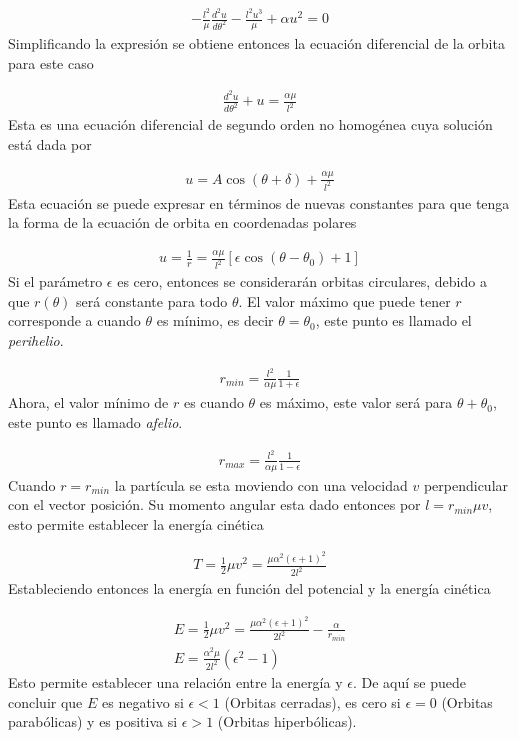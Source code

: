 \begin{gather*}
    -\frac{l^2}{\mu}\frac{d^2u}{d\theta^2} - \frac{l^2u^3}{\mu} + \alpha u^2 = 0
\end{gather*}
Simplificando la expresión se obtiene entonces la ecuación diferencial de la orbita para este caso 

\begin{gather}
    \frac{d^2u}{d\theta^2} + u = \frac{\alpha\mu}{l^2}
\end{gather}
Esta es una ecuación diferencial de segundo orden no homogénea cuya solución está dada por 

\begin{gather*}
    u = A\cos(\theta + \delta) + \frac{\alpha \mu}{l^2}
\end{gather*}
Esta ecuación se puede expresar en términos de nuevas constantes para que tenga la forma de la ecuación de orbita en coordenadas polares

\begin{gather}
    u  = \frac{1}{r} = \frac{\alpha \mu}{l^2}\left[\epsilon\cos(\theta - \theta_0) + 1\right]
\end{gather}
Si el parámetro $\epsilon$ es cero, entonces se considerarán orbitas circulares, debido a que $r(\theta)$ será constante para todo $\theta$. El valor máximo que puede tener $r$ corresponde a cuando $\theta$ es mínimo, es decir $\theta = \theta_0$, este punto es llamado el \textit{perihelio}.

\begin{gather*}
    r_{min} = \frac{l^2}{\alpha \mu}\frac{1}{1 + \epsilon}
\end{gather*}
Ahora, el valor mínimo de $r$ es cuando $\theta$ es máximo, este valor será para $\theta + \theta_0$, este punto es llamado \textit{afelio}.

\begin{gather*}
    r_{max} = \frac{l^2}{\alpha \mu}\frac{1}{1 - \epsilon}
\end{gather*}
Cuando $r = r_{min}$ la partícula se esta moviendo con una velocidad $v$ perpendicular con el vector posición. Su momento angular esta dado entonces por $l = r_{min}\mu v$, esto permite establecer la energía cinética

\begin{gather*}
    T = \frac{1}{2}\mu v^2 = \frac{\mu \alpha^2 (\epsilon + 1)^2}{2l^2}
\end{gather*}
Estableciendo entonces la energía en función del potencial y la energía cinética 

\begin{gather*}
    E = \frac{1}{2}\mu v^2 = \frac{\mu \alpha^2 (\epsilon + 1)^2}{2l^2} - \frac{\alpha}{r_{min}}\\
    E = \frac{\alpha^2\mu}{2l^2}(\epsilon^2 - 1) 
\end{gather*}
Esto permite establecer una relación entre la energía y $\epsilon$. De aquí se puede concluir que $E$ es negativo si $\epsilon < 1$ (Orbitas cerradas), es cero si $\epsilon = 0$ (Orbitas parabólicas) y es positiva si $\epsilon > 1$  (Orbitas hiperbólicas).
